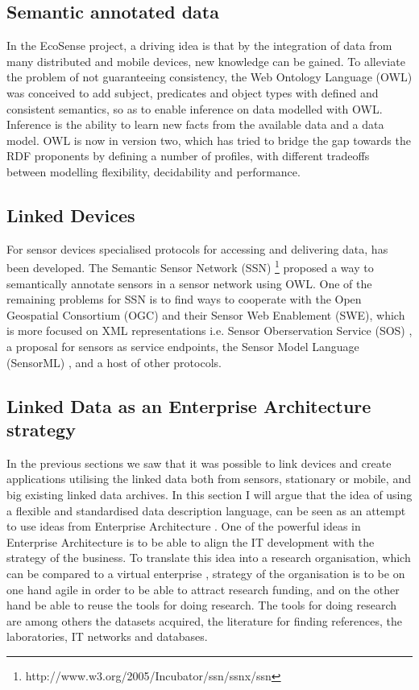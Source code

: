 \subsection{Semantic annotated data}
In the EcoSense project, a driving idea is that by the integration of data from many distributed and mobile devices, new knowledge can be gained. To alleviate the problem of not guaranteeing consistency, the Web Ontology Language (OWL) was conceived to add subject, predicates and object types with defined and consistent semantics, so as to enable inference on data modelled with OWL. Inference is the ability to learn new facts from the available data and a data model. OWL is now in version two, which has tried to bridge the gap towards the RDF proponents by defining a number of profiles, with different tradeoffs between modelling flexibility, decidability and performance.	
\subsection{Linked Devices}
For sensor devices specialised protocols for accessing and delivering data, has been developed. The Semantic Sensor Network (SSN) \footnote{http://www.w3.org/2005/Incubator/ssn/ssnx/ssn} proposed a way to semantically annotate sensors in a sensor network using OWL. One of the remaining problems for SSN is to find ways to cooperate with the Open Geospatial Consortium (OGC) and their Sensor Web Enablement (SWE), which is more focused on XML representations i.e. Sensor Oberservation Service (SOS) \cite{Henson2009}, a proposal for sensors as service endpoints, the Sensor Model Language (SensorML) \cite{russomanno2005}, and a host of other protocols.
\subsection{Linked Data as an Enterprise Architecture strategy}
In the previous sections we saw that it was possible to link devices and create applications utilising the linked data both from sensors, stationary or mobile, and big existing linked data archives. In this section I will argue that the idea of using a flexible and standardised data description language, can be seen as an attempt to use ideas from Enterprise Architecture \cite{Tamm}. One of the powerful ideas in Enterprise Architecture is to be able to align the IT development with the strategy of the business. To translate this idea into a research organisation, which can be compared to a virtual enterprise \cite{February1998}, strategy of the organisation is to be on one hand agile in order to be able to attract research funding, and on the other hand be able to reuse the tools for doing research. The tools for doing research are among others the datasets acquired, the literature for finding references, the laboratories, IT networks and databases. 

